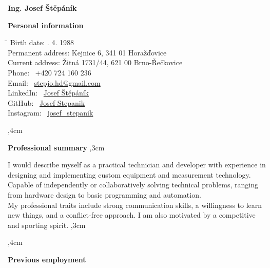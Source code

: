 \documentclass[10pt]{article}
\begin{document}
\begin{center}
\textbf{\LARGE Ing. Josef Štěpáník} \\
\end{center}

\textbf{Personal information} 

\begin{tabbing}
    \hspace{6cm}\= \kill
    Birth date: . 4. 1988 \\
    Permanent address: \> Kejnice 6, 341 01 Horažďovice \\
    Current address: \> Žitná 1731/44, 621 00 Brno-Řečkovice \\
    Phone: \> \faPhone \ +420 724 160 236 \\
    Email: \> \faEnvelope \ \href{mailto:stepjo.hd@gmail.com}{stepjo.hd@gmail.com} \\
    LinkedIn: \>  \faLinkedin \ \href{https://www.linkedin.com/in/josef-štěpáník-30106174/}{Josef Štěpáník} \\
    GitHub: \>  \faGithub \ \href{https://github.com/JosefStepanik}{Josef Stepanik} \\
    Instagram: \>  \faInstagram \ \href{https://www.instagram.com/josef_stepanik/}{josef\_stepanik}
\end{tabbing}

\noindent\hrulefill
{},4cm

\textbf{Professional summary}
,3cm

\indent I would describe myself as a practical technician and developer with experience in designing and implementing custom equipment and measurement technology.
Capable of independently or collaboratively solving technical problems, ranging from hardware design to basic programming and automation. \\
\indent My professional traits include strong communication skills, a willingness to learn new things, and a conflict-free approach. I am also motivated by a competitive and sporting spirit.
,3cm

\noindent\hrulefill
{},4cm

\textbf{Previous employment}
\end{document}
